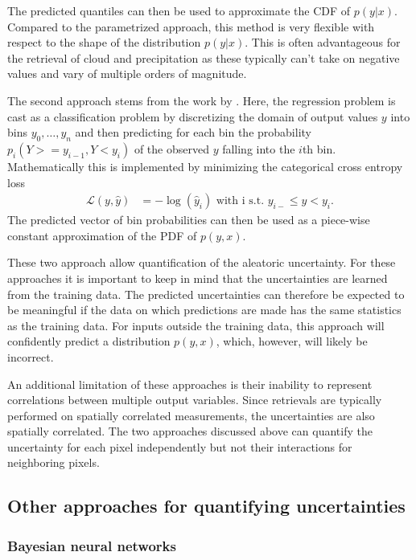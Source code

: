 \begin{description}
The predicted quantiles can then be used to approximate the CDF of $p(y|x)$.
Compared to the parametrized approach, this method is very flexible with respect
to the shape of the distribution $p(y|x)$. This is often advantageous for the
retrieval of cloud and precipitation as these typically can't take on negative
values and vary of multiple orders of magnitude.

The second approach stems from the work by \citep{sonderby20}. Here, the
regression problem is cast as a classification problem by discretizing the
domain of output values $y$ into bins $y_0, \ldots, y_n$ and then predicting for
each bin the probability $p_i(Y >= y_{i - 1}, Y < y_i)$ of the observed $y$
falling into the $i$th bin. Mathematically this is implemented by minimizing the
categorical cross entropy loss
\begin{align}
  \mathcal{L}(y, \hat{y}) &=  -\log(\hat{y}_i) \text { with i s.t. } y_{i - } \leq y < y_i.
\end{align}
The predicted vector of bin probabilities can then be used as a piece-wise constant
approximation of the PDF of $p(y, x)$.

These two approach allow quantification of the aleatoric uncertainty. For these
approaches it is important to keep in mind that the uncertainties are learned from
the training data. The predicted uncertainties can therefore be expected to
be meaningful if the data on which predictions are made has the same statistics
as the training data. For inputs outside the training data, this approach will
confidently predict a distribution $p(y, x)$, which, however, will likely
be incorrect.

An additional limitation of these approaches is their inability to represent
correlations between multiple output variables. Since retrievals are typically
performed on spatially correlated measurements, the uncertainties are also
spatially correlated. The two approaches discussed above can quantify the
uncertainty for each pixel independently but not their interactions for
neighboring pixels.

\subsection{Other approaches for quantifying uncertainties}

\subsubsection{Bayesian neural networks}


\end{description}
